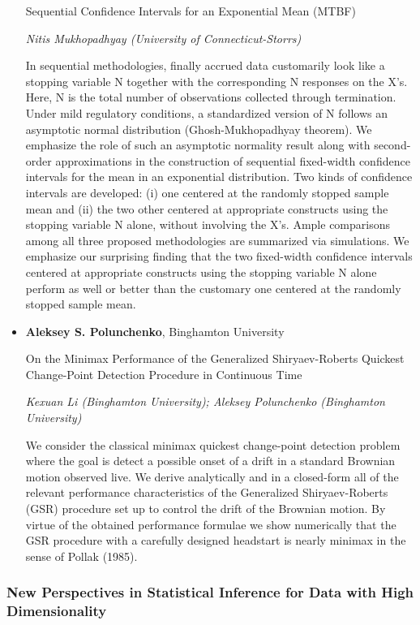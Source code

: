 \begin{itemize}
Sequential Confidence Intervals for an Exponential Mean (MTBF)

\emph{\footnotesize Nitis Mukhopadhyay (University of Connecticut-Storrs)}

In sequential methodologies, finally accrued data customarily look like a stopping variable N together with the corresponding N responses on the X’s. Here, N is the total number of observations collected through termination. Under mild regulatory conditions, a standardized version of N follows an asymptotic normal distribution (Ghosh-Mukhopadhyay theorem). We emphasize the role of such an asymptotic normality result along with second-order approximations in the construction of sequential fixed-width confidence intervals for the mean in an exponential distribution. Two kinds of confidence intervals are developed: (i) one centered at the randomly stopped sample mean and (ii) the two other centered at appropriate constructs using the stopping variable N alone, without involving the X’s. Ample comparisons among all three proposed methodologies are summarized via simulations. We emphasize our surprising finding that the two fixed-width confidence intervals centered at appropriate constructs using the stopping variable N alone perform as well or better than the customary one centered at the randomly stopped sample mean.

\item \textbf{Aleksey S. Polunchenko}, Binghamton University

On the Minimax Performance of the Generalized Shiryaev-Roberts Quickest Change-Point Detection Procedure in Continuous Time

\emph{\footnotesize Kexuan Li (Binghamton University); Aleksey Polunchenko (Binghamton University)}

We consider the classical minimax quickest change-point detection problem where the goal is detect a possible onset of a drift in a standard Brownian motion observed live. We derive analytically and in a closed-form all of the relevant performance characteristics of the Generalized Shiryaev-Roberts (GSR) procedure set up to control the drift of the Brownian motion. By virtue of the obtained performance formulae we show numerically that the GSR procedure with a carefully designed headstart is nearly minimax in the sense of Pollak (1985).

\end{itemize}

\subsubsection*{New Perspectives in Statistical Inference for Data with High Dimensionality}

